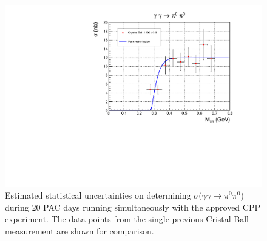 \begin{figure}[tpb]
\centering
\includegraphics[page=4,width=4.75in]{figures/sigma_2pi0_figs.pdf}
\caption{Estimated statistical uncertainties on determining $\sigma(\gamma\gamma\rightarrow\pi^0\pi^0$) during 20 PAC days running simultaneously with the approved CPP experiment. The data points from the single previous Cristal Ball measurement \cite{Marsiske:1990hx} are shown for comparison.
\label{fig:sigma_2pi0_figs_4}}
\end{figure}






